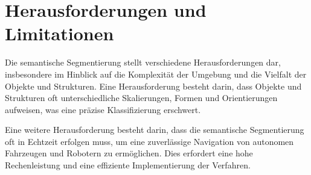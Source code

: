 \section{Herausforderungen und Limitationen}
Die semantische Segmentierung stellt verschiedene Herausforderungen dar,
insbesondere im Hinblick auf die Komplexität der Umgebung und die Vielfalt der
Objekte und Strukturen. Eine Herausforderung besteht darin, dass Objekte und
Strukturen oft unterschiedliche Skalierungen, Formen und Orientierungen
aufweisen, was eine präzise Klassifizierung erschwert.

Eine weitere Herausforderung besteht darin, dass die semantische Segmentierung
oft in Echtzeit erfolgen muss, um eine zuverlässige Navigation von autonomen
Fahrzeugen und Robotern zu ermöglichen. Dies erfordert eine hohe Rechenleistung
und eine effiziente Implementierung der Verfahren.
